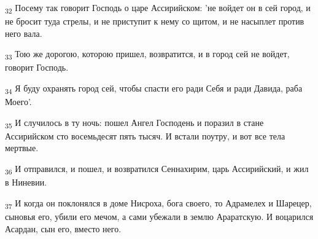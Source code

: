 \begin{tcolorbox}
\textsubscript{32} Посему так говорит Господь о царе Ассирийском: 'не войдет он в сей город, и не бросит туда стрелы, и не приступит к нему со щитом, и не насыплет против него вала.
\end{tcolorbox}
\begin{tcolorbox}
\textsubscript{33} Тою же дорогою, которою пришел, возвратится, и в город сей не войдет, говорит Господь.
\end{tcolorbox}
\begin{tcolorbox}
\textsubscript{34} Я буду охранять город сей, чтобы спасти его ради Себя и ради Давида, раба Моего'.
\end{tcolorbox}
\begin{tcolorbox}
\textsubscript{35} И случилось в ту ночь: пошел Ангел Господень и поразил в стане Ассирийском сто восемьдесят пять тысяч. И встали поутру, и вот все тела мертвые.
\end{tcolorbox}
\begin{tcolorbox}
\textsubscript{36} И отправился, и пошел, и возвратился Сеннахирим, царь Ассирийский, и жил в Ниневии.
\end{tcolorbox}
\begin{tcolorbox}
\textsubscript{37} И когда он поклонялся в доме Нисроха, бога своего, то Адрамелех и Шарецер, сыновья его, убили его мечом, а сами убежали в землю Араратскую. И воцарился Асардан, сын его, вместо него.
\end{tcolorbox}
